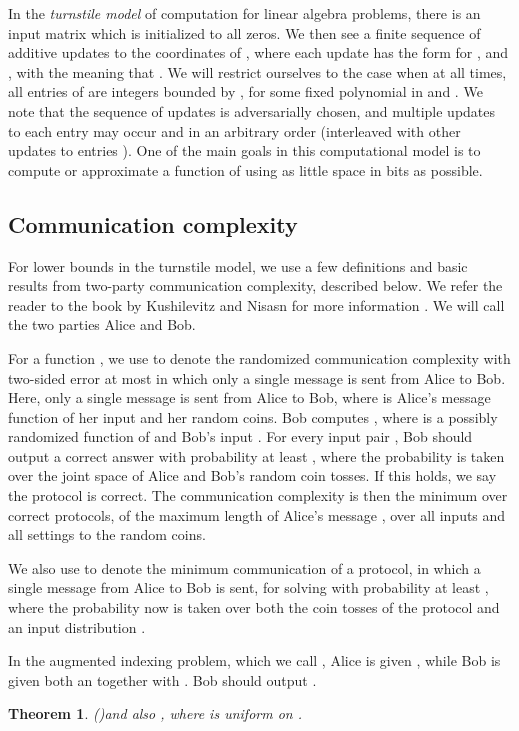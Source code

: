 \documentclass[11pt]{article}
\newtheorem{theorem}{Theorem}
\begin{document}
In the {\it turnstile model} of computation for linear algebra problems, there is an input matrix
 which is initialized to all zeros. We then see a finite sequence of 
additive updates to the coordinates of , where each update has the form 
for , and , with the meaning that 
. We will restrict ourselves to the case when at all
times, all entries of  are integers bounded by , for some fixed polynomial
in  and . We note that the sequence of updates is adversarially chosen, and multiple
updates to each entry  may occur and in an arbitrary order (interleaved with other
updates to entries ). One of the main goals in this computational model is to
compute or approximate a function of  using as little space in bits as possible. 

\subsection{Communication complexity}
For lower bounds in the turnstile model, we use a few definitions and basic results
from two-party communication complexity, described below. We refer the reader to the
book by Kushilevitz and Nisasn for more information \cite{kn97}.
We will call the two parties Alice and Bob.

For a function , we use 
 to denote the randomized communication complexity with 
two-sided error at most  in which only a single message is sent from 
Alice to Bob. Here, only a single message  is sent from Alice to Bob,
where  is Alice's message function of her input  and her random coins. Bob
computes , where  is a possibly randomized function of 
and Bob's input . For every input pair , Bob should output a correct
answer with probability at least , where the probability is taken over the joint
space of Alice and Bob's random coin tosses. If this holds, we say the protocol is correct.
The communication complexity  is then the minimum over correct protocols, 
of the maximum length of Alice's message , over all inputs and all settings to the 
random coins. 

We also use  to denote the minimum 
communication of a protocol, in which a single message from Alice to Bob is 
sent, for solving  with probability at least , where the 
probability now is taken over both the coin tosses of the protocol and an input 
distribution .

In the augmented indexing problem, which we call 
, Alice is given , while Bob is given 
both an  together with . Bob should 
output .
\begin{theorem}(\cite{MNSW98})\label{thm:mnsw}
 and also
,
where  is uniform on .
\end{theorem}
\end{document}
